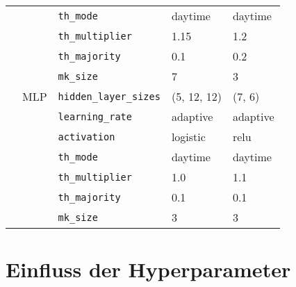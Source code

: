 \begin{table}[ht!]
\begin{tabular}{lllll}
                        &           & \texttt{th\_mode}             & daytime     & daytime     \\
                        &           & \texttt{th\_multiplier}       & 1.15        & 1.2         \\
                        &           & \texttt{th\_majority}         & 0.1         & 0.2         \\
                        &           & \texttt{mk\_size}             & 7           & 3           \\
                        & MLP       & \texttt{hidden\_layer\_sizes} & (5, 12, 12) & (7, 6)      \\
                        &           & \texttt{learning\_rate}       & adaptive    & adaptive    \\
                        &           & \texttt{activation}           & logistic    & relu        \\
                        &           & \texttt{th\_mode}             & daytime     & daytime     \\
                        &           & \texttt{th\_multiplier}       & 1.0         & 1.1         \\
                        &           & \texttt{th\_majority}         & 0.1         & 0.1         \\
                        &           & \texttt{mk\_size}             & 3           & 3            \\
    \end{tabular}
\end{table}

\newpage
\phantom{phantom}
\newpage

\section{Einfluss der Hyperparameter \label{appendix-ranking}}

